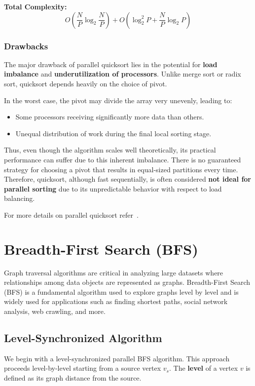 \documentclass[12pt]{book}
\begin{document}
\textbf{Total Complexity:}
\[
O\left(\frac{N}{P} \log_2 \frac{N}{P}\right) + O\left(\log_2^2 P + \frac{N}{P} \log_2 P\right)
\]

\subsubsection*{Drawbacks}

The major drawback of parallel quicksort lies in the potential for \textbf{load imbalance} and \textbf{underutilization of processors}. Unlike merge sort or radix sort, quicksort depends heavily on the choice of pivot.

In the worst case, the pivot may divide the array very unevenly, leading to:
\begin{itemize}
    \item Some processors receiving significantly more data than others.
    \item Unequal distribution of work during the final local sorting stage.
\end{itemize}

Thus, even though the algorithm scales well theoretically, its practical performance can suffer due to this inherent imbalance. There is no guaranteed strategy for choosing a pivot that results in equal-sized partitions every time. Therefore, quicksort, although fast sequentially, is often considered \textbf{not ideal for parallel sorting} due to its unpredictable behavior with respect to load balancing.

For more details on parallel quicksort refer~\cite{kumar1994introduction}.

\section{Breadth-First Search (BFS)}

Graph traversal algorithms are critical in analyzing large datasets where relationships among data objects are represented as graphs. Breadth-First Search (BFS) is a fundamental algorithm used to explore graphs level by level and is widely used for applications such as finding shortest paths, social network analysis, web crawling, and more.

\subsection{Level-Synchronized Algorithm}

We begin with a level-synchronized parallel BFS algorithm. This approach proceeds level-by-level starting from a source vertex $v_s$. The \textbf{level} of a vertex $v$ is defined as its graph distance from the source.
\end{document}
